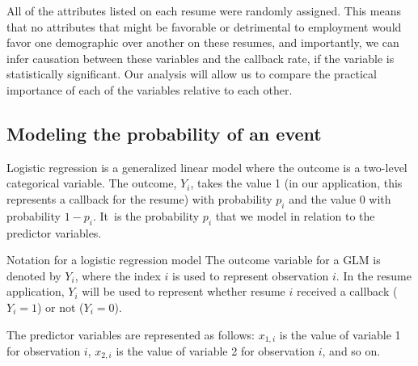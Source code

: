 All of the attributes listed on each resume were
randomly assigned.
This means that no attributes that might be favorable
or detrimental to employment would favor one demographic
over another on these resumes,
and importantly, we can infer causation between these
variables and the callback rate, if the variable is
statistically significant.
Our analysis will allow us to compare the practical
importance of each of the variables relative to each other.




\subsection{Modeling the probability of an event}
\label{modelingTheProbabilityOfAnEvent}

Logistic regression is a generalized linear model where
the outcome is a two-level categorical variable.
The outcome, $Y_i$, takes the value 1
(in our application, this represents a callback
for the resume)
with probability $p_i$
and the value 0 with probability $1 - p_i$.
It~is the probability $p_i$ that we model in relation
to the predictor variables.

\begin{onebox}{Notation for a logistic regression model}
The outcome variable for a GLM is denoted by $Y_i$,
where the index $i$ is used to represent observation $i$.
In the resume application, $Y_i$ will be used to represent
whether resume $i$ received a callback ($Y_i=1$)
or not ($Y_i=0$). \vspace{3mm}

The predictor variables are represented as follows:
$x_{1,i}$ is the value of variable 1 for observation $i$,
$x_{2,i}$ is the value of variable 2 for observation $i$,
and so on.
\end{onebox}

